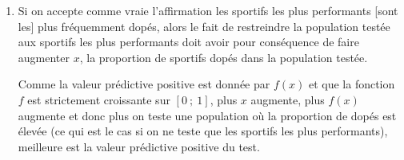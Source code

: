 \begin{enumerate}
\begin{enumerate}
\item Si on accepte comme vraie l'affirmation \og les sportifs les plus performants [sont les] plus fréquemment dopés\fg{}, alors le fait de restreindre la population testée aux sportifs les plus performants doit avoir pour conséquence de faire augmenter $x$, la proportion de sportifs dopés dans la population testée.

Comme la valeur prédictive positive est donnée par $f(x)$ et que la fonction $f$ est strictement croissante sur $ [0~;~1] $, plus $x$ augmente, plus $f(x)$ augmente et donc plus on teste une population où la proportion de dopés est élevée (ce qui est le cas si on ne teste que les sportifs les plus performants), meilleure est la valeur prédictive positive du test.
		\end{enumerate}
	\end{enumerate}

\vspace{5mm}
